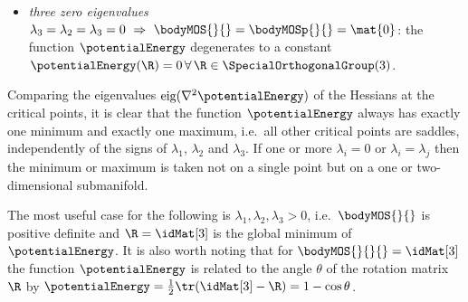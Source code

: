 \begin{Example}
\begin{itemize}
\item \textit{three zero eigenvalues} $\lambda_3 = \lambda_2 = \lambda_3 = 0 \ \Rightarrow \ \bodyMOS{}{} = \bodyMOSp{}{} = \mat{0}$: the function $\potentialEnergy$ degenerates to a constant $\potentialEnergy(\R) = 0 \, \forall \, \R \in \SpecialOrthogonalGroup(3)$.
\end{itemize}
Comparing the eigenvalues $\text{eig}(\nabla^2\potentialEnergy)$ of the Hessians at the critical points, it is clear that the function $\potentialEnergy$ always has exactly one minimum and exactly one maximum, i.e.\ all other critical points are saddles, independently of the signs of $\lambda_1$, $\lambda_2$ and $\lambda_3$.
If one or more $\lambda_i = 0$ or $\lambda_i=\lambda_j$ then the minimum or maximum is taken not on a single point but on a one or two-dimensional submanifold.

The most useful case for the following is $\lambda_1, \lambda_2, \lambda_3 > 0$, i.e.\ $\bodyMOS{}{}$ is positive definite and $\R = \idMat[3]$ is the global minimum of $\potentialEnergy$.
It is also worth noting that for $\bodyMOS{}{}{} = \idMat[3]$ the function $\potentialEnergy$ is related to the angle $\theta$ of the rotation matrix $\R$ by $\potentialEnergy = \tfrac{1}{2} \tr(\idMat[3] - \R) = 1 - \cos\theta$.
\end{Example}